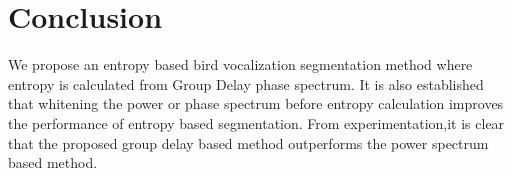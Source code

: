 \documentclass[a4paper]{article}
\begin{document}

 
 
 
 
 
 
 
 
\section{Conclusion}
We propose an entropy based bird vocalization segmentation method where entropy is calculated from Group Delay phase spectrum. It is also established that whitening the power or phase spectrum before entropy calculation improves the performance of entropy based segmentation. From experimentation,it is clear that the proposed group delay based method outperforms the power spectrum based method.  



  \newpage
  \eightpt
  

  

\end{document}
